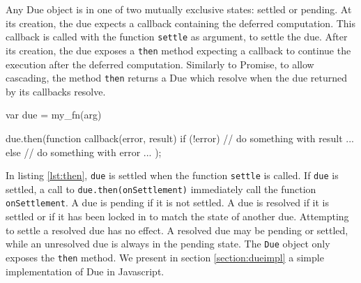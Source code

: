 Any Due object is in one of two mutually exclusive states: settled or pending.
At its creation, the due expects a callback containing the deferred computation.
This callback is called with the function \texttt{settle} as argument, to settle the due.
After its creation, the due exposes a \texttt{then} method expecting a callback to continue the execution after the deferred computation.
Similarly to Promise, to allow cascading, the method \texttt{then} returns a Due which resolve when the due returned by its callbacks resolve.

\begin{code}[js, %
             caption={Example of a due}, %
             label={lst:then}] %
var due = my_fn(arg)

due.then(function callback(error, result) {
  if (!error) {
    // do something with result ...
  } else {
    // do something with error ...
  }
});
\end{code}

In listing \ref{lst:then}, \texttt{due} is settled when the function \texttt{settle} is called.
If \texttt{due} is settled, a call to \texttt{due.then(onSettlement)} immediately call the function \texttt{onSettlement}.
A due is pending if it is not settled.
A due is resolved if it is settled or if it has been locked in to match the state of another due.
Attempting to settle a resolved due has no effect.
A resolved due may be pending or settled, while an unresolved due is always in the pending state.
The \texttt{Due} object only exposes the \texttt{then} method.
We present in section \ref{section:dueimpl} a simple implementation of Due in Javascript.
